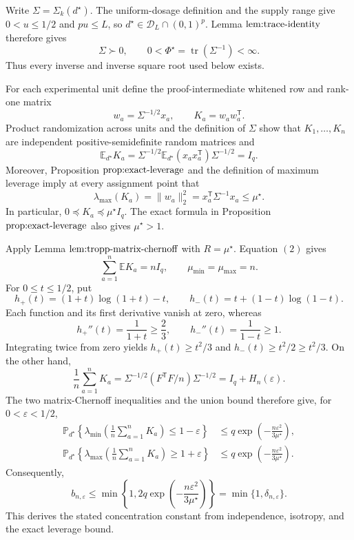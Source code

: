 Write \(\Sigma=\Sigma_k(d^\star)\).  The uniform-dosage definition and the supply range give \(0<u\le1/2\) and \(pu\le L\), so \(d^\star\in\mathcal D_L\cap(0,1)^p\).  Lemma \(\textnormal{lem:trace-identity}\) therefore gives
\[
 \Sigma\succ0,
 \qquad
 0<\Phi^\star=\operatorname{tr}(\Sigma^{-1})<\infty .
 \tag{1}
\]
Thus every inverse and inverse square root used below exists.

For each experimental unit define the proof-intermediate whitened row and rank-one matrix
\[
 w_a=\Sigma^{-1/2}x_a,
 \qquad
 K_a=w_aw_a^{\mathsf T}.
\]
Product randomization across units and the definition of \(\Sigma\) show that \(K_1,\ldots,K_n\) are independent positive-semidefinite random matrices and
\[
 \mathbb E_{d^\star}K_a
 =\Sigma^{-1/2}\mathbb E_{d^\star}(x_ax_a^{\mathsf T})\Sigma^{-1/2}
 =I_q.
 \tag{2}
\]
Moreover, Proposition \(\textnormal{prop:exact-leverage}\) and the definition of maximum leverage imply at every assignment point that
\[
 \lambda_{\max}(K_a)=\|w_a\|_2^2
 =x_a^{\mathsf T}\Sigma^{-1}x_a\le\mu^\star.
 \tag{3}
\]
In particular, \(0\preceq K_a\preceq\mu^\star I_q\).  The exact formula in Proposition \(\textnormal{prop:exact-leverage}\) also gives \(\mu^\star>1\).

Apply Lemma \(\textnormal{lem:tropp-matrix-chernoff}\) with \(R=\mu^\star\).  Equation \((2)\) gives
\[
 \sum_{a=1}^n\mathbb E K_a=nI_q,
 \qquad
 \mu_{\min}=\mu_{\max}=n.
 \tag{4}
\]
For \(0\le t\le1/2\), put
\[
 h_+(t)=(1+t)\log(1+t)-t,
 \qquad
 h_-(t)=t+(1-t)\log(1-t).
\]
Each function and its first derivative vanish at zero, whereas
\[
 h_+''(t)=\frac1{1+t}\ge\frac23,
 \qquad
 h_-''(t)=\frac1{1-t}\ge1.
\]
Integrating twice from zero yields \(h_+(t)\ge t^2/3\) and \(h_-(t)\ge t^2/2\ge t^2/3\).  On the other hand,
\[
 \frac1n\sum_{a=1}^nK_a
 =\Sigma^{-1/2}(F^{\mathsf T}F/n)\Sigma^{-1/2}
 =I_q+H_n(\varepsilon).
 \tag{5}
\]
The two matrix-Chernoff inequalities and the union bound therefore give, for \(0<\varepsilon<1/2\),
\[
\begin{aligned}
 \mathbb P_{d^\star}\!\left\{\lambda_{\min}\!\left(\frac1n\sum_{a=1}^nK_a\right)\le1-\varepsilon\right\}
 &\le q\exp\!\left(-\frac{n\varepsilon^2}{3\mu^\star}\right),\\
 \mathbb P_{d^\star}\!\left\{\lambda_{\max}\!\left(\frac1n\sum_{a=1}^nK_a\right)\ge1+\varepsilon\right\}
 &\le q\exp\!\left(-\frac{n\varepsilon^2}{3\mu^\star}\right).
\end{aligned}
\]
Consequently,
\[
 b_{n,\varepsilon}
 \le\min\!\left\{1,2q\exp\!\left(-\frac{n\varepsilon^2}{3\mu^\star}\right)\right\}
 =\min\{1,\delta_{n,\varepsilon}\}.
 \tag{6}
\]
This derives the stated concentration constant from independence, isotropy, and the exact leverage bound.

